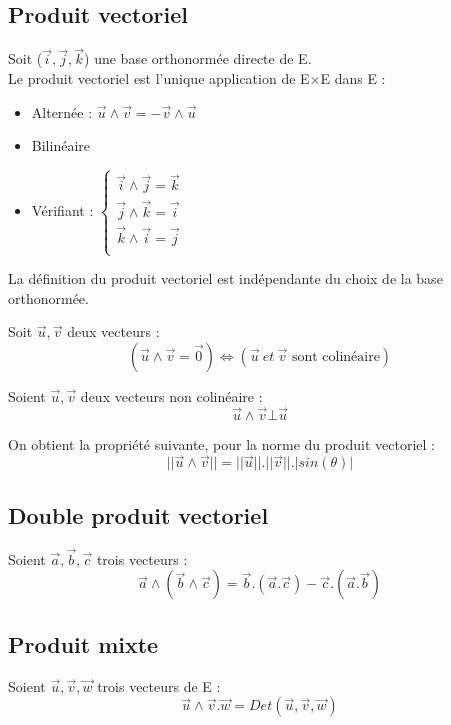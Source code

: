 \subsection{Produit vectoriel}
\begin{de}
 Soit ($\overrightarrow{i},\overrightarrow{j},\overrightarrow{k}$) une base orthonormée directe de E.\\
Le produit vectoriel est l'unique application de E$\times$E dans E :\\
\begin{itemize}
 \item Alternée : $\overrightarrow{u}\wedge\overrightarrow{v} = -\overrightarrow{v}\wedge\overrightarrow{u}$
 \item Bilinéaire
 \item Vérifiant : 
$\left\{\begin{array}{l}
\overrightarrow{i}\wedge\overrightarrow{j} = \overrightarrow{k}\\
\overrightarrow{j}\wedge\overrightarrow{k} = \overrightarrow{i}\\
\overrightarrow{k}\wedge\overrightarrow{i} = \overrightarrow{j}\\  
\end{array}\right.$
\end{itemize}
La définition du produit vectoriel est indépendante du choix de la base orthonormée.
\end{de}
\begin{prop}
Soit $\overrightarrow{u},\overrightarrow{v}$ deux vecteurs :
$$(\overrightarrow{u}\wedge\overrightarrow{v}=\overrightarrow{0}) \Leftrightarrow ( \overrightarrow{u}~ et~ \overrightarrow{v} \mbox{ sont colinéaire})$$
\end{prop}
\begin{prop}
Soient $\overrightarrow{u},\overrightarrow{v}$ deux vecteurs non colinéaire : 
$$\overrightarrow{u}\wedge\overrightarrow{v}\bot\overrightarrow{u}$$
\end{prop}
\begin{prop}
On obtient la propriété suivante, pour la norme du produit vectoriel : 
$$||\overrightarrow{u}\wedge\overrightarrow{v}|| = ||\overrightarrow{u}||.||\overrightarrow{v}||.|sin(\theta)|$$
\end{prop}
\subsection{Double produit vectoriel}
\begin{prop}
Soient $\overrightarrow{a},\overrightarrow{b},\overrightarrow{c}$ trois vecteurs :
$$\overrightarrow{a}\wedge(\overrightarrow{b}\wedge\overrightarrow{c}) = \overrightarrow{b}.(\overrightarrow{a}.\overrightarrow{c}) - \overrightarrow{c}.(\overrightarrow{a}.\overrightarrow{b})$$ 
\end{prop}

\subsection{Produit mixte}
\begin{de}
 Soient $\overrightarrow{u},\overrightarrow{v},\overrightarrow{w}$ trois vecteurs de E :
$$\overrightarrow{u}\wedge\overrightarrow{v}.\overrightarrow{w} = Det(\overrightarrow{u},\overrightarrow{v},\overrightarrow{w})$$
\end{de}

